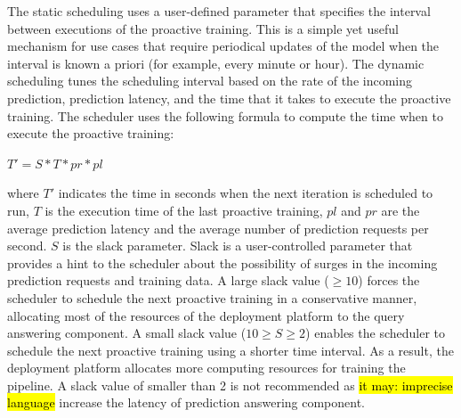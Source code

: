 The static scheduling uses a user-defined parameter that specifies the interval between executions of the proactive training.
This is a simple yet useful mechanism for use cases that require periodical updates of the model when the interval is known a priori (for example, every minute or hour). 
The dynamic scheduling tunes the scheduling interval based on the rate of the incoming prediction, prediction latency, and the time that it takes to execute the proactive training.
The scheduler uses the following formula to compute the time when to execute the proactive training:
\begin{center}
$T' = S * T * pr * pl$
\end{center}
where $T'$ indicates the time in seconds when the next iteration is scheduled to run, $T$ is the execution time of the last proactive training, $pl$ and $pr$ are the average prediction latency and the average number of prediction requests per second.
$S$ is the slack parameter.
Slack is a user-controlled parameter that provides a hint to the scheduler about the possibility of surges in the incoming prediction requests and training data.
A large slack value ($\geq10$) forces the scheduler to schedule the next proactive training in a conservative manner, allocating most of the resources of the deployment platform to the query answering component.
A small slack value ($10 \geq S \geq 2$) enables the scheduler to schedule the next proactive training using a shorter time interval.
As a result, the deployment platform allocates more computing resources for training the pipeline.
A slack value of smaller than 2 is not recommended as \hl{it may: imprecise language} increase the latency of prediction answering component.

